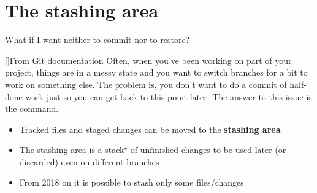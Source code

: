 \documentclass[usenames,svgnames,14pt]{beamer}
\begin{document}
\section{The stashing area}
\begin{frame}{What if I want neither to commit nor to restore?}
    \begin{varblock}{}[\textwidth]{From Git documentation}
        Often, when you’ve been working on part of your project, things are in a messy state and you want to switch branches for a bit to work on something else. The problem is, you don’t want to do a commit of half-done work just so you can get back to this point later. The answer to this issue is the \textbf{} command.
    \end{varblock}
    \setlength{\leftmargini}{4mm}
    \begin{itemize}
        \item \alert{Tracked files and staged changes} can be moved to the \textbf{stashing area}
        \item The stashing area is a stack$^\star$ of unfinished changes to be used later (or discarded) even on different branches
        \item From 2018 on it is possible to stash only some files/changes
    \end{itemize}
\end{frame}
\end{document}
